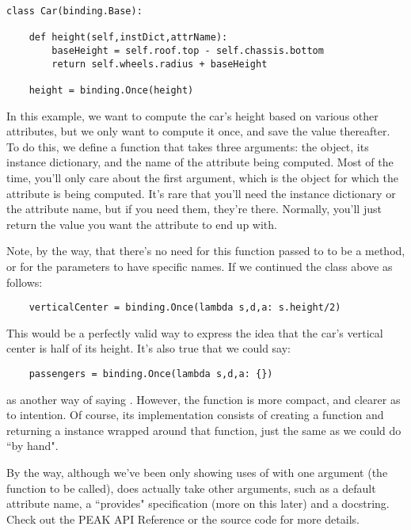 \begin{verbatim}
class Car(binding.Base):

    def height(self,instDict,attrName):
        baseHeight = self.roof.top - self.chassis.bottom
        return self.wheels.radius + baseHeight

    height = binding.Once(height)

\end{verbatim}

In this example, we want to compute the car's height based on various other
attributes, but we only want to compute it once, and save the value thereafter.
To do this, we define a function that takes three arguments: the object, its
instance dictionary, and the name of the attribute being computed.  Most of the
time, you'll only care about the first argument, which is the object for which
the attribute is being computed.  It's rare that you'll need the instance
dictionary or the attribute name, but if you need them, they're there.
Normally, you'll just return the value you want the attribute to end up with.

Note, by the way, that there's no need for this function passed to
 to be a method, or for the parameters to have specific
names.  If we continued the class above as follows:

\begin{verbatim}
    verticalCenter = binding.Once(lambda s,d,a: s.height/2)

\end{verbatim}

This would be a perfectly valid way to express the idea that the car's vertical
center is half of its height.  It's also true that we could say:




\begin{verbatim}
    passengers = binding.Once(lambda s,d,a: {})

\end{verbatim}

as another way of saying .  However, the
 function is more compact, and clearer as to intention.
Of course, its implementation consists of creating a function and returning a
 instance wrapped around that function, just the same as
we could do ``by hand".

By the way, although we've been only showing uses of  with
one argument (the function to be called),  does actually
take other arguments, such as a default attribute name, a ``provides" 
specification (more on this later) and a docstring.  Check out the PEAK
API Reference or the source code for more details.

























